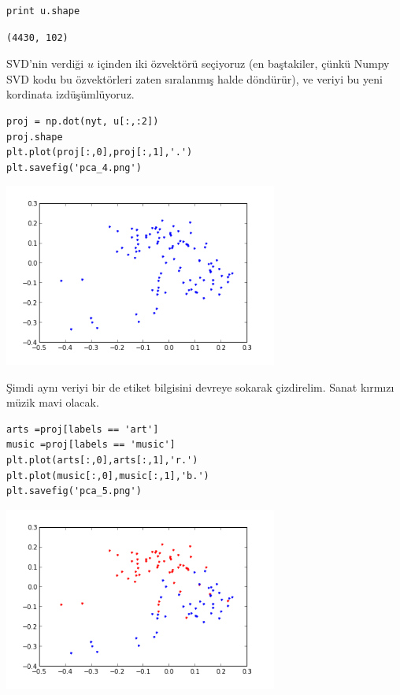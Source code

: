 \documentclass[12pt,fleqn]{article}\usepackage{../../common}
\begin{document}
\begin{verbatim}
print u.shape
\end{verbatim}

\begin{verbatim}
(4430, 102)
\end{verbatim}

SVD'nin verdiği $u$ içinden iki özvektörü seçiyoruz (en baştakiler,
çünkü Numpy SVD kodu bu özvektörleri zaten sıralanmış halde döndürür),
ve veriyi bu yeni kordinata izdüşümlüyoruz.

\begin{verbatim}
proj = np.dot(nyt, u[:,:2])
proj.shape
plt.plot(proj[:,0],proj[:,1],'.')
plt.savefig('pca_4.png')
\end{verbatim}

\includegraphics[height=6cm]{pca_4.png}

Şimdi aynı veriyi bir de etiket bilgisini devreye sokarak
çizdirelim. Sanat kırmızı müzik mavi olacak.

\begin{verbatim}
arts =proj[labels == 'art']
music =proj[labels == 'music']
plt.plot(arts[:,0],arts[:,1],'r.')
plt.plot(music[:,0],music[:,1],'b.')
plt.savefig('pca_5.png')
\end{verbatim}

\includegraphics[height=6cm]{pca_5.png}
\end{document}
